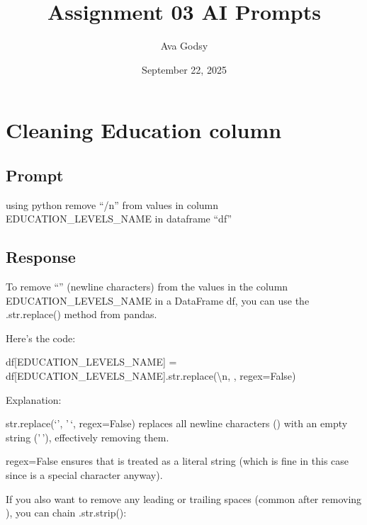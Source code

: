 \documentclass[
  letterpaper,
  DIV=11,
  numbers=noendperiod]{scrartcl}
\title{Assignment 03 AI Prompts}
\author{Ava Godsy}
\date{September 22, 2025}
\newenvironment{Shaded}{\begin{snugshade}}{\end{snugshade}}
\newcommand{\BuiltInTok}[1]{\textcolor[rgb]{0.00,0.23,0.31}{#1}}
\newcommand{\CharTok}[1]{\textcolor[rgb]{0.13,0.47,0.30}{#1}}
\newcommand{\NormalTok}[1]{\textcolor[rgb]{0.00,0.23,0.31}{#1}}
\newcommand{\OperatorTok}[1]{\textcolor[rgb]{0.37,0.37,0.37}{#1}}
\newcommand{\StringTok}[1]{\textcolor[rgb]{0.13,0.47,0.30}{#1}}
\newcommand{\VariableTok}[1]{\textcolor[rgb]{0.07,0.07,0.07}{#1}}
\begin{document}
\maketitle


\section{Cleaning Education column}\label{cleaning-education-column}

\subsection{Prompt}\label{prompt}

using python remove ``/n'' from values in column EDUCATION\_LEVELS\_NAME
in dataframe ``df''

\subsection{Response}\label{response}

To remove ``\n'' (newline characters) from the values in the column
EDUCATION\_LEVELS\_NAME in a DataFrame df, you can use the
.str.replace() method from pandas.

Here's the code:

\begin{Shaded}
\begin{Highlighting}[]
\NormalTok{df[}\StringTok{\textquotesingle{}EDUCATION\_LEVELS\_NAME\textquotesingle{}}\NormalTok{] }\OperatorTok{=}\NormalTok{ df[}\StringTok{\textquotesingle{}EDUCATION\_LEVELS\_NAME\textquotesingle{}}\NormalTok{].}\BuiltInTok{str}\NormalTok{.replace(}\StringTok{\textquotesingle{}}\CharTok{\textbackslash{}n}\StringTok{\textquotesingle{}}\NormalTok{, }\StringTok{\textquotesingle{}\textquotesingle{}}\NormalTok{, regex}\OperatorTok{=}\VariableTok{False}\NormalTok{)}
\end{Highlighting}
\end{Shaded}

Explanation:

str.replace(`\n', '\,`, regex=False) replaces all newline characters
(\n) with an empty string ('\,'), effectively removing them.

regex=False ensures that \n is treated as a literal string (which is
fine in this case since \n is a special character anyway).

If you also want to remove any leading or trailing spaces (common after
removing \n), you can chain .str.strip():
\end{document}
